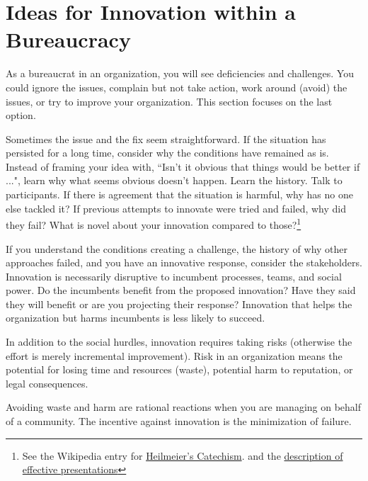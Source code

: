 \section{Ideas for Innovation within a Bureaucracy\label{sec:innovation}}

As a bureaucrat in an organization, you will see deficiencies and challenges. You could ignore the issues, complain but not take action, work around (avoid) the issues, or try to improve your organization. This section focuses on the last option.

Sometimes the issue and the fix seem straightforward. If the situation has persisted for a long time, consider why the conditions have remained as is. 
Instead of framing your idea with, ``Isn't it obvious that things would be better if ...", learn why what seems obvious doesn't happen. 
Learn the history. Talk to participants. If there is agreement that the situation is harmful, why has no one else tackled it? If previous attempts to innovate were tried and failed, why did they fail? What is novel about your innovation compared to those?\footnote{See the Wikipedia entry for  \href{https://en.wikipedia.org/wiki/George_H._Heilmeier\%23Heilmeier's_Catechism}{Heilmeier's Catechism}.
and the \hyperref[sec:effective-presentations]{description of effective presentations}
\iftoggle{haspagenumbers}{ on page~\pageref{sec:effective-presentations}.}{.}
}

If you understand the conditions creating a challenge,  the history of why other approaches failed, and you have an innovative response, consider the stakeholders. 
Innovation is necessarily disruptive to incumbent processes, teams, and social power. 
Do the incumbents benefit from the proposed innovation? Have they said they will benefit or are you projecting their response? 
Innovation that helps the organization but harms incumbents is less likely to succeed. 

In addition to the social hurdles, innovation requires taking risks (otherwise the effort is merely incremental improvement). Risk in an organization means the potential for losing time and resources (waste), potential harm to reputation, or legal consequences. 

Avoiding waste and harm are rational reactions when you are managing \iftoggle{glossarysubstitutionworks}{\glspl{shared resource}}{shared resources} on behalf 
of a community. The incentive against innovation is the minimization of failure.

